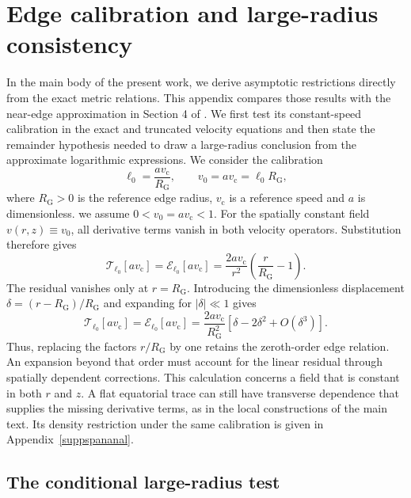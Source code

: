 \documentclass[amsmath,amsfonts,amssymb,aps,pra,superscriptaddress,10pt]{revtex4-2}
\numberwithin{equation}{section}
\theoremstyle{plain}
\theoremstyle{definition}
\theoremstyle{remark}
\theoremstyle{definition}
\newcommand{\ellzero}{\ell_0}
\newcommand{\RG}{R_{\mathrm G}}
\newcommand{\vc}{v_{\mathrm c}}
\newcommand{\ET}{\mathcal T_{\ellzero}}
\newcommand{\EE}{\mathcal E_{\ellzero}}
\begin{document}
\section{Edge calibration and large-radius consistency}
\label{suppretasympt}

In the main body of the present work, we derive asymptotic restrictions directly from the exact metric relations. This appendix compares those results with the near-edge approximation in Section 4 of \cite{Astesiano2022EPJC}. We first test its constant-speed calibration in the exact and truncated velocity equations and then state the remainder hypothesis needed to draw a large-radius conclusion from the approximate logarithmic expressions. We consider the calibration
\begin{equation}\label{calchoice}
\ellzero=\frac{a\vc}{\RG},\qquad 
v_0=a\vc=\ellzero\RG,
\end{equation}
where $\RG>0$ is the reference edge radius, $\vc$ is a reference speed and $a$ is dimensionless. we assume $0<v_0=a\vc<1$. For the spatially constant field $v(r,z)\equiv v_0$, all derivative terms vanish in both velocity operators. Substitution therefore gives
\begin{equation}
\ET[a\vc]=\EE[a\vc]=\frac{2a\vc}{r^2}\left(\frac{r}{\RG}-1\right).
\end{equation}
The residual vanishes only at $r=\RG$. Introducing the dimensionless displacement $\delta=(r-\RG)/\RG$ and expanding for $|\delta|\ll 1$ gives
\begin{equation}
\ET[a\vc]=\EE[a\vc]=\frac{2a\vc}{\RG^2}\left[\delta-2\delta^2+O(\delta^3)\right].
\end{equation}
Thus, replacing the factors $r/\RG$ by one retains the zeroth-order edge relation. An expansion beyond that order must account for the linear residual through spatially dependent corrections. This calculation concerns a field that is constant in both $r$ and $z$. A flat equatorial trace can still have transverse dependence that supplies the missing derivative terms, as in the local constructions of the main text. Its density restriction under the same calibration is given in Appendix~\ref{suppspananal}.

\subsection{The conditional large-radius test}
\end{document}
